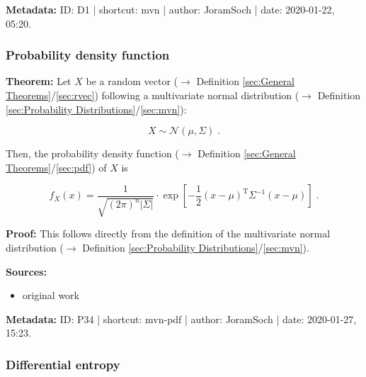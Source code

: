 \documentclass[a4paper,12pt,twoside]{book}
\begin{document}
\vspace{1em}
\textbf{Metadata:} ID: D1 | shortcut: mvn | author: JoramSoch | date: 2020-01-22, 05:20.
\vspace{1em}



\subsubsection[\textbf{Probability density function}]{Probability density function} \label{sec:mvn-pdf}
\setcounter{equation}{0}

\textbf{Theorem:} Let $X$ be a random vector ($\rightarrow$ Definition \ref{sec:General Theorems}/\ref{sec:rvec}) following a multivariate normal distribution ($\rightarrow$ Definition \ref{sec:Probability Distributions}/\ref{sec:mvn}):

\begin{equation} \label{eq:mvn-pdf-mvn}
X \sim \mathcal{N}(\mu, \Sigma) \; .
\end{equation}

Then, the probability density function ($\rightarrow$ Definition \ref{sec:General Theorems}/\ref{sec:pdf}) of $X$ is

\begin{equation} \label{eq:mvn-pdf-mvn-pdf}
f_X(x) = \frac{1}{\sqrt{(2 \pi)^n |\Sigma|}} \cdot \exp \left[ -\frac{1}{2} (x-\mu)^\mathrm{T} \Sigma^{-1} (x-\mu) \right] \; .
\end{equation}


\vspace{1em}
\textbf{Proof:} This follows directly from the definition of the multivariate normal distribution ($\rightarrow$ Definition \ref{sec:Probability Distributions}/\ref{sec:mvn}).


\vspace{1em}
\textbf{Sources:}
\begin{itemize}
\item original work\end{itemize}


\vspace{1em}
\textbf{Metadata:} ID: P34 | shortcut: mvn-pdf | author: JoramSoch | date: 2020-01-27, 15:23.
\vspace{1em}



\subsubsection[\textbf{Differential entropy}]{Differential entropy} \label{sec:mvn-dent}
\setcounter{equation}{0}
\end{document}
